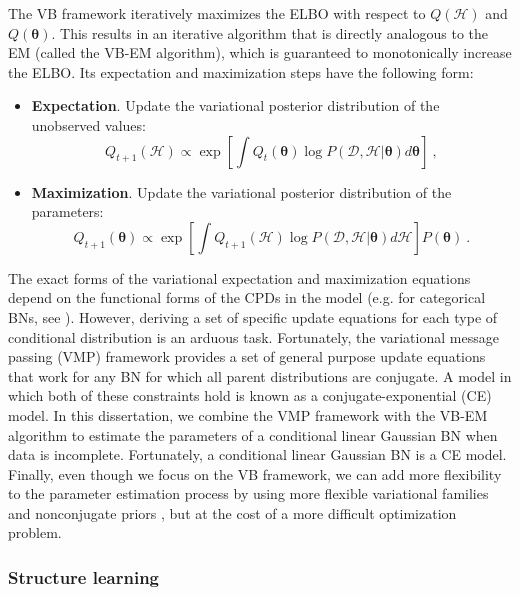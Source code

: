 The VB framework iteratively maximizes the ELBO with respect to $Q(\mathcal{H})$ and $Q(\bm{\theta})$. This results in an iterative algorithm that is directly analogous to the EM (called the VB-EM algorithm), which is guaranteed to monotonically increase the ELBO. Its expectation and maximization steps have the following form:
\begin{itemize}
	\item \textbf{Expectation}. Update the variational posterior distribution of the unobserved values:
	\begin{equation*} \label{eq:variational_update_latent}
	Q_{t+1}(\mathcal{H}) \propto  \exp \left[ \int Q_{t}(\bm{\theta}) \log P(\mathcal{D}, \mathcal{H} | \bm{\theta}) d\bm{\theta} \right] \ ,
	\end{equation*}
	\item \textbf{Maximization}. Update the variational posterior distribution of the parameters:
	\begin{equation*} \label{eq:variational_update_parameters}
	Q_{t+1}(\bm{\theta}) \propto  \exp \left[ \int Q_{t+1}(\mathcal{H}) \log P(\mathcal{D}, \mathcal{H} | \bm{\theta})  d\mathcal{H} \right]  P(\bm{\theta}) \ .
	\end{equation*}
\end{itemize}

The exact forms of the variational expectation and maximization equations depend on the functional forms of the CPDs in the model (e.g. for categorical BNs, see \citep{beal2006}). However, deriving a set of specific update equations for each type of conditional distribution is an arduous task. Fortunately, the variational message passing (VMP) framework \citep{winn2005} provides a set of general purpose update equations  that work for any BN for which all parent distributions are conjugate. A model in which both of these constraints hold is known as a conjugate-exponential (CE) model. In this dissertation, we combine the VMP framework with the VB-EM algorithm to estimate the parameters of a conditional linear Gaussian BN when data is incomplete. Fortunately, a conditional linear Gaussian BN is a CE model. Finally, even though we focus on the VB framework, we can add more flexibility to the parameter estimation process by using more flexible variational families \citep{bishop1998, barber1999} and nonconjugate priors \citep{wang2013nonconj}, but at the cost of a more difficult optimization problem.
\subsubsection{Structure learning}

